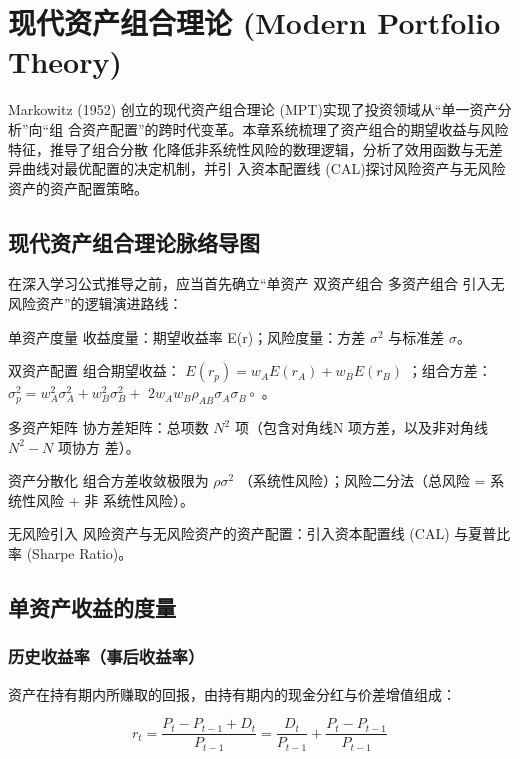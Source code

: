 \documentclass[lang=cn,10pt,color=blue]{elegantbook}
\begin{document}
\chapter{现代资产组合理论 (Modern Portfolio Theory)}

Markowitz (1952) 创立的现代资产组合理论 (MPT)实现了投资领域从“单一资产分析”向“组 合资产配置”的跨时代变革。本章系统梳理了资产组合的期望收益与风险特征，推导了组合分散 化降低非系统性风险的数理逻辑，分析了效用函数与无差异曲线对最优配置的决定机制，并引 入资本配置线 (CAL)探讨风险资产与无风险资产的资产配置策略。 

\section{现代资产组合理论脉络导图}

在深入学习公式推导之前，应当首先确立“单资产 双资产组合 多资产组合 引入无 风险资产”的逻辑演进路线： 

单资产度量 收益度量：期望收益率 E(r)；风险度量：方差 $\sigma ^ { 2 }$ 与标准差 $\sigma$。 

双资产配置 组合期望收益： $E ( r _ { p } ) = w _ { A } E ( r _ { A } ) + w _ { B } E ( r _ { B } )$ ；组合方差： $\sigma _ { p } ^ { 2 } = w _ { A } ^ { 2 } \sigma _ { A } ^ { 2 } + w _ { B } ^ { 2 } \sigma _ { B } ^ { 2 } +$ $2 w _ { A } w _ { B } \rho _ { A B } \sigma _ { A } \sigma _ { B } \circ$ 。 

多资产矩阵 协方差矩阵：总项数 $N ^ { 2 }$ 项（包含对角线N 项方差，以及非对角线 $N ^ { 2 } - N$ 项协方 差）。 

资产分散化 组合方差收敛极限为 $\rho \sigma ^ { 2 }$ （系统性风险）；风险二分法（总风险 = 系统性风险 + 非 系统性风险）。 

无风险引入 风险资产与无风险资产的资产配置：引入资本配置线 (CAL) 与夏普比率 (Sharpe Ratio)。 

\section{单资产收益的度量}

\subsection{历史收益率（事后收益率）}

资产在持有期内所赚取的回报，由持有期内的现金分红与价差增值组成： 

$$
\boxed {r _ {t} = \frac {P _ {t} - P _ {t - 1} + D _ {t}}{P _ {t - 1}}} = \frac {D _ {t}}{P _ {t - 1}} + \frac {P _ {t} - P _ {t - 1}}{P _ {t - 1}}
$$
\end{document}
